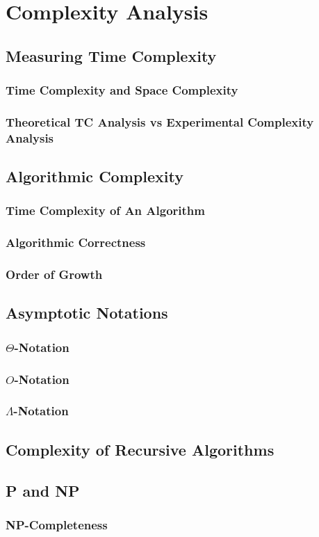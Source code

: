 \chapter{Complexity Analysis}
\section{Measuring Time Complexity}
\subsection{Time Complexity and Space Complexity}
\subsection{Theoretical TC Analysis vs Experimental Complexity Analysis}
\section{Algorithmic Complexity}
\subsection{Time Complexity of An Algorithm}
\subsection{Algorithmic Correctness}
\subsection{Order of Growth}
\section{Asymptotic Notations}
\subsection{$\Theta$-Notation}
\subsection{$O$-Notation}
\subsection{$\Lambda$-Notation}
\section{Complexity of Recursive Algorithms}
\section{P and NP}
\subsection{NP-Completeness}